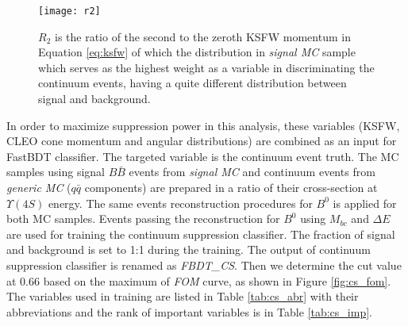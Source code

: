 \begin{figure}[H]
	\centering
	\texttt{[image: r2]}
	\caption{$R_2$ is the ratio of the second to the zeroth KSFW momentum in Equation \ref{eq:ksfw} of which the distribution in \textit{signal MC} sample which serves as the highest weight as a variable in discriminating the continuum events, having a quite different distribution between signal and background.}
	\label{fig:R2}
\end{figure}



  In order to maximize suppression power in this analysis, these variables (KSFW, CLEO cone momentum and angular distributions) are combined as an input for FastBDT classifier. The targeted variable is the continuum event truth. The MC samples using signal $B\bar{B}$ events from \textit{signal MC} and continuum events from \textit{generic MC} ($q\bar{q}$ components) are prepared in a ratio of their cross-section at $\Upsilon{(4S)}$ energy. The same events reconstruction procedures for $B^0$ is applied for both MC samples. Events passing the reconstruction for $B^0$ using $M_{bc}$ and $\Delta E$ are used for training the continuum suppression classifier. The fraction of signal and background is set to 1:1 during the training.  The output of continuum suppression classifier is renamed as \textit{FBDT\_CS}. Then we determine the cut value at 0.66 based on the maximum of \textit{FOM} curve, as shown in Figure \ref{fig:cs_fom}. The variables used in training are listed in Table \ref{tab:cs_abr} with their abbreviations and the rank of important variables is in Table \ref{tab:cs_imp}.

